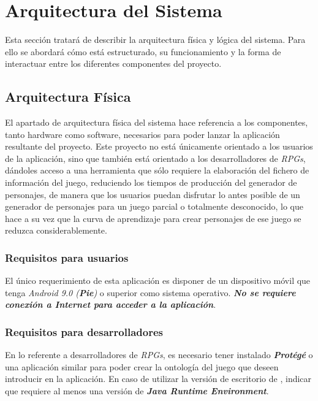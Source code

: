 
\section{Arquitectura del Sistema}
Esta sección tratará de describir la arquitectura física y lógica del sistema. Para ello se abordará cómo 
está estructurado, su funcionamiento y la forma de interactuar entre los diferentes componentes del 
proyecto.

\subsection{Arquitectura Física}
El apartado de arquitectura física del sistema hace referencia a los componentes, tanto hardware como software,
necesarios para poder lanzar la aplicación resultante del proyecto. Este proyecto no está únicamente orientado 
a los usuarios de la aplicación, sino que también está orientado a los desarrolladores de \textit{RPGs}, dándoles acceso
a una herramienta que sólo requiere la elaboración del fichero de información del juego, reduciendo los tiempos de 
producción del generador de personajes, de manera que los usuarios puedan disfrutar lo antes posible de un generador 
de personajes para un juego parcial o totalmente desconocido, lo que hace a su vez que la curva de aprendizaje para 
crear personajes de ese juego se reduzca considerablemente.

\subsubsection{Requisitos para usuarios}
El único requerimiento de esta aplicación es disponer de un dispositivo móvil que tenga 
\textit{Android 9.0 (\textbf{Pie})} o superior como sistema operativo.
\textit{\textbf{No se requiere conexión a Internet para acceder a la aplicación}}. 

\subsubsection{Requisitos para desarrolladores}
En lo referente a desarrolladores de \textit{RPGs}, es necesario tener instalado \textit{\textbf{Protégé}} o una aplicación
similar para poder crear la ontología del juego que deseen introducir en la aplicación. En caso de utilizar la versión de 
escritorio de \protege, indicar que requiere al menos una versión de \textit{\textbf{Java Runtime Environment}}.

